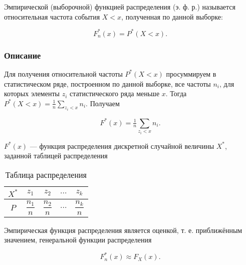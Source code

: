 Эмпирической (выборочной) функцией распределения (э. ф. р.) называется относительная частота события $X < x$, полученная по данной выборке:

\begin{equation}
	F_n^*(x) = P^*(X < x).
\end{equation}

\subsubsection{Описание}

Для получения относительной частоты $P^*(X < x)$ просуммируем в статистическом ряде, построенном по данной выборке, все частоты $n_i$, для которых элементы $z_i$ статистического ряда меньше $x$. Тогда $P^*(X < x) = \tfrac{1}{n}\sum\limits_{z_i < x}n_i$. Получаем

\begin{equation}
	F^*(x) = \tfrac{1}{n}\sum\limits_{z_i < x}n_i.
\end{equation}

$F^*(x)$ --- функция распределения дискретной случайной величины $X^*$, заданной таблицей распределения

\begin{table}[h!]
	\begin{center}
		\begin{tabular}{|c|c|c|c|c|}
			\hline
			$X^*$ & $z_1$ & $z_2$ & $...$ & $z_k$ \\
			\hline
			$P$ & $\dfrac{n_1}{n}$ & $\dfrac{n_2}{n}$ & $...$ & $\dfrac{n_k}{n}$ \\
			\hline
		\end{tabular}
	\end{center}
	\caption{Таблица распределения}
\end{table}

Эмпирическая функция распределения является оценкой, т. е. приближённым значением, генеральной функции распределения

\begin{equation}
	F_n^*(x) \approx F_X(x).
\end{equation}
